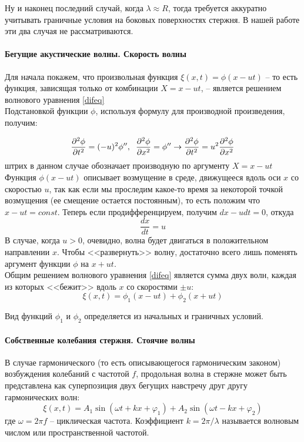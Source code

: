 \documentclass[a4paper,12pt]{article}
\begin{document}
	Ну и наконец последний случай, когда $\lambda \approx R$, тогда требуется аккуратно учитывать граничные условия на боковых поверхностях стержня. В нашей работе эти два случая не рассматриваются.
	
	\paragraph{Бегущие акустические волны. Скорость волны} Для начала покажем, что произвольная функция $\xi(x,t)=\phi(x-ut)$ -- то есть функция, зависящая только от комбинации $X=x-ut$, -- является решением волнового уравнения \eqref{difeq}\\
	
	Подстановкой функции $\phi$, используя формулу для производной произведения, получим:
	
	\[
		\frac{\partial^2\phi}{\partial t^2}=(-u)^2\phi'',\hspace{2mm}
		\frac{\partial^2\phi}{\partial x^2}=\phi'' \rightarrow
		\frac{\partial^2\phi}{\partial t^2}=
		u^2\frac{\partial^2\phi}{\partial x^2}
	\]
	штрих в данном случае обозначает производную по аргументу $X=x-ut$\\
	
	Функция $\phi(x-ut)$ описывает возмущение в среде, движущееся вдоль оси $x$ со скоростью $u$, так как если мы проследим какое-то время за некоторой точкой возмущения (ее смещение остается постоянным), то есть положим что $x-ut=const$. Теперь если продифференцируем, получим $dx-udt=0$, откуда
	\[
		\frac{dx}{dt}=u
	\]
	В случае, когда $u>0$, очевидно, волна будет двигаться в положительном направлении $x$. Чтобы <<развернуть>> волну, достаточно всего лишь поменять аргумент функции $\phi$ на $x+ut$.\\
	
	Общим решением волнового уравнения \eqref{difeq} является сумма двух волн, каждая из которых <<бежит>> вдоль $x$ со скоростями $\pm u$:
	\begin{equation}
		\label{sol}
		\xi(x,t)=\phi_1(x-ut)+\phi_2(x+ut)
	\end{equation}
	
	Вид функций $\phi_1$ и $\phi_2$ определяется из начальных и граничных условий.
	
	\paragraph{Собственные колебания стержня. Стоячие волны} В случае гармонического (то есть описывающегося гармоническим законом) возбуждения колебаний с частотой $f$, продольная волна в стержне может быть представлена как суперпозиция двух бегущих навстречу друг другу гармонических волн:
	\begin{equation}
		\label{std}
		\xi(x,t)=A_1\sin{(\omega t+kx+\varphi_1)}+
		A_2\sin{(\omega t-kx+\varphi_2)}
	\end{equation}
	где $\omega = 2\pi f$ -- циклическая частота. Коэффициент $k=2\pi/\lambda$ называется волновым числом или пространственной частотой.\\
	
\end{document}
